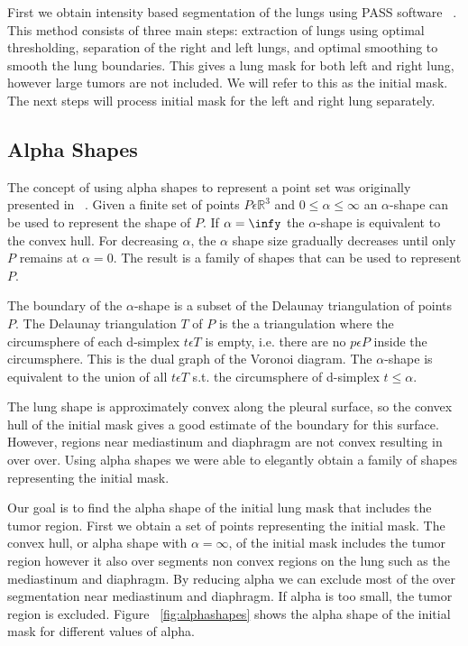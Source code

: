 \documentclass{llncs}
\begin{document}
First we obtain intensity based segmentation of the lungs using PASS software ~\cite{guo2008}. This method consists of three main steps: extraction of lungs using optimal thresholding, separation of the right and left lungs, and optimal smoothing to smooth the lung boundaries. This gives a lung mask for both left and right lung, however large tumors are not included. We will refer to this as the initial mask. The next steps will process initial mask for the left and right lung separately. 
%
\subsection{Alpha Shapes}
%
The concept of using alpha shapes to represent a point set was originally presented in ~\cite{edelsbrunner1983}.
Given a finite set of points $P \epsilon \mathbb{R}^3$ and $ 0 \leq \alpha \leq \infty $ an $\alpha$-shape can be used to represent the shape of $P$. If $\alpha=\infy$ the $\alpha$-shape is equivalent to the convex hull. For decreasing $\alpha$, the $\alpha$ shape size gradually decreases until only $P$ remains at $\alpha=0$. The result is a family of shapes that can be used to represent $P$.

The boundary of the $\alpha$-shape is a subset of the Delaunay triangulation of points $P$. The Delaunay triangulation $T$ of $P$ is the a triangulation where the circumsphere of each d-simplex $t \epsilon T$ is empty, i.e. there are no  $p \epsilon P$ inside the circumsphere. This is the dual graph of the Voronoi diagram. The $\alpha$-shape is equivalent to the union of all $t \epsilon T$ s.t. the circumsphere of d-simplex $t \leq \alpha$. 

The lung shape is approximately convex along the pleural surface, so the convex hull of the initial mask gives a good estimate of the boundary for this surface.
 However, regions near mediastinum and diaphragm are not convex resulting in over over. Using alpha shapes we were able to elegantly obtain a family of shapes representing the initial mask. 


Our goal is to find the alpha shape of the initial lung mask that includes the tumor region. First we obtain a set of points representing the initial mask. The convex hull, or alpha shape with $ \alpha = \infty $, of the initial mask includes the tumor region however it also over segments non convex regions on the lung such as the mediastinum and diaphragm. By reducing alpha we can exclude most of the over segmentation near mediastinum and diaphragm. If alpha is too small, the tumor region is excluded. Figure ~\ref{fig:alphashapes} shows the alpha shape of the initial mask for different values of alpha. 
\end{document}
